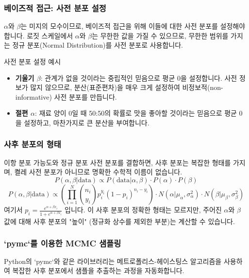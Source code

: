 \documentclass[11pt,a4paper]{article}
\begin{document}
\subsubsection*{베이즈적 접근: 사전 분포 설정}
$\alpha$와 $\beta$는 미지의 모수이므로, 베이즈적 접근을 위해 이들에 대한 사전 분포를 설정해야 합니다. 로짓 스케일에서 $\alpha$와 $\beta$는 무한한 값을 가질 수 있으므로, 무한한 범위를 가지는 정규 분포(Normal Distribution)를 사전 분포로 사용합니다.

\begin{mybox}{사전 분포 설정 예시}
\begin{itemize}
    \item \textbf{기울기 $\beta$}: 관계가 없을 것이라는 중립적인 믿음으로 평균 0을 설정합니다. 사전 정보가 많지 않으므로, 분산(표준편차)을 매우 크게 설정하여 비정보적(non-informative) 사전 분포를 만듭니다.
    \item \textbf{절편 $\alpha$}: 재료 양이 0일 때 50:50의 확률로 맛을 좋아할 것이라는 믿음으로 평균 0을 설정하고, 마찬가지로 큰 분산을 부여합니다.
\end{itemize}
\end{mybox}

\subsubsection*{사후 분포의 형태}
이항 분포 가능도와 정규 분포 사전 분포를 결합하면, 사후 분포는 복잡한 형태를 가지며, 켤레 사전 분포가 아니므로 명확한 수학적 이름이 없습니다.
\[ P(\alpha, \beta | \text{data}) \propto P(\text{data} | \alpha, \beta) \cdot P(\alpha) \cdot P(\beta) \]
\[ P(\alpha, \beta | \text{data}) \propto \left( \prod_{i=1}^{N} \binom{n_i}{y_i} p_i^{y_i} (1-p_i)^{n_i-y_i} \right) \cdot N(\alpha | \mu_\alpha, \sigma_\alpha^2) \cdot N(\beta | \mu_\beta, \sigma_\beta^2) \]
여기서 $p_i = \frac{e^{\alpha + \beta x_i}}{1 + e^{\alpha + \beta x_i}}$ 입니다.
이 사후 분포의 정확한 형태는 모르지만, 주어진 $\alpha$와 $\beta$ 값에 대해 사후 분포의 "높이" (정규화 상수를 제외한 부분)는 계산할 수 있습니다.

\subsubsection*{`pymc`를 이용한 MCMC 샘플링}
Python의 `pymc`와 같은 라이브러리는 메트로폴리스-헤이스팅스 알고리즘을 사용하여 복잡한 사후 분포에서 샘플을 추출하는 과정을 자동화합니다.
\end{document}
